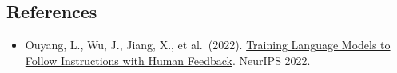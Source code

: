 \FloatBarrier
{}
\hypertarget{references-79}{%
\subsection{References}\label{references-79}}

\vspace{0.25em}
\begin{itemize}
\tightlist
\item
  Ouyang, L., Wu, J., Jiang, X., et al.~(2022). \href{https://arxiv.org/abs/2203.02155}{Training Language Models to Follow Instructions with Human Feedback}. NeurIPS 2022.
\end{itemize}

\clearpage

